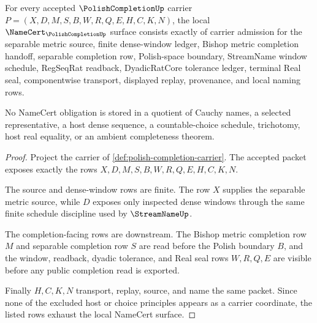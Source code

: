 \begin{theorem}
\label{thm:polish-completion-namecert-obligations}
For every accepted $\PolishCompletionUp$ carrier $P=(X,D,M,S,B,W,R,Q,E,H,C,K,N)$, the local $\NameCert_{\PolishCompletionUp}$ surface consists exactly of carrier admission for the separable metric source, finite dense-window ledger, Bishop metric completion handoff, separable completion row, Polish-space boundary, StreamName window schedule, RegSeqRat readback, DyadicRatCore tolerance ledger, terminal Real seal, componentwise transport, displayed replay, provenance, and local naming rows.

No NameCert obligation is stored in a quotient of Cauchy names, a selected representative, a host dense sequence, a countable-choice schedule, trichotomy, host real equality, or an ambient completeness theorem.
\end{theorem}
\begin{proof}
Project the carrier of \autoref{def:polish-completion-carrier}. The accepted packet exposes exactly the rows $X,D,M,S,B,W,R,Q,E,H,C,K,N$.

The source and dense-window rows are finite. The row $X$ supplies the separable metric source, while $D$ exposes only inspected dense windows through the same finite schedule discipline used by $\StreamNameUp$.

The completion-facing rows are downstream. The Bishop metric completion row $M$ and separable completion row $S$ are read before the Polish boundary $B$, and the window, readback, dyadic tolerance, and Real seal rows $W,R,Q,E$ are visible before any public completion read is exported.

Finally $H,C,K,N$ transport, replay, source, and name the same packet. Since none of the excluded host or choice principles appears as a carrier coordinate, the listed rows exhaust the local NameCert surface.
\end{proof}

